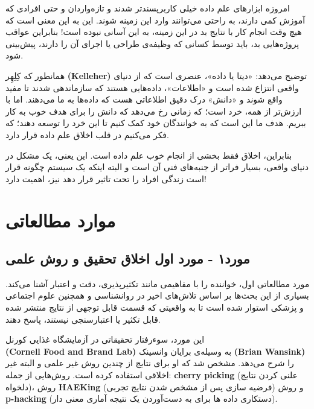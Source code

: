 امروزه ابزارهای علم داده خیلی کاربرپسندتر شدند و تازه‌واردان و حتی افرادی که آموزش کمی دارند، به راحتی می‌توانند وارد این زمینه شوند.
این به این معنی است که هیچ وقت انجام کار با نتایج بد در این زمینه، به این آسانی نبوده است!
بنابراین عواقب پروژه‌هایی بد، باید توسط کسانی که وظیفه‌ی طراحی یا اجرای آن را دارند، پیش‌بینی شود.

همانطور که کِلِهِر \textenglish{\textbf{(Kelleher)}} توضیح می‌دهد: «دیتا یا داده»، عنصری است که از دنیای واقعی انتزاع شده است و «اطلاعات»، داده‌هایی هستند که سازماندهی شدند تا مفید واقع شوند و «دانش» درک دقیق اطلاعاتی هست که داده‌ها به ما می‌دهند.
اما با ارزش‌تر از همه، خرد است؛ که زمانی رخ می‌دهد که دانش را برای هدف خوب به کار ببریم.
هدف ما این است که به خوانندگان خود کمک کنیم تا این خرد را توسعه دهند؛ که فکر می‌کنیم در قلب اخلاق علم داده قرار دارد.

بنابراین، اخلاق فقط بخشی از انجام خوب علم داده است.
این یعنی، یک مشکل در دنیای واقعی، بسیار فراتر از جنبه‌های فنی آن است و البته اینکه یک سیستم چگونه قرار است زندگی افراد را تحت تاثیر قرار دهد نیز، اهمیت دارد!
\newline
\newline

{
\section*{موارد مطالعاتی}
\label{sec:موارد مطالعاتی}


\subsection*{مورد۱ - مورد اول اخلاق تحقیق و روش علمی}
\label{subsec:مورد۱ - مورد اول اخلاق تحقیق و روش علمی}
مورد مطالعاتی اول، خواننده را با مفاهیمی مانند تکثیرپذیری، دقت و اعتبار آشنا می‌کند.
بسیاری از این بحث‌ها بر اساس تلاش‌های اخیر در روانشناسی و همچنین علوم اجتماعی و پزشکی استوار شده است تا به واقعیتی که قسمت قابل توجهی از نتایج منتشر شده قابل تکثیر یا اعتبارسنجی نیستند، پاسخ دهند.
}
\newpage

این مورد، سوءرفتار تحقیقاتی در آزمایشگاه غذایی کورنل \\ \textenglish{\textbf{(Cornell Food and Brand Lab)}} به وسیله‌ی برایان وانسینک \textenglish{\textbf{(Brian Wansink)}} را شرح می‌دهد.
مشخص شد که او برای نتایج از چندین روش غیر علمی و البته غیر اخلاقی استفاده کرده است.
روش‌هایی از جمله: \textenglish{\textbf{cherry picking}} (علنی کردن نتایج دلخواه)، روش \textenglish{\textbf{HAEKing}} (فرضیه سازی پس از مشخص شدن نتایج تجربی) و روش \textenglish{\textbf{p-hacking}} (دستکاری داده ها برای به دست‌آوردن یک نتیجه آماری معنی دار).


